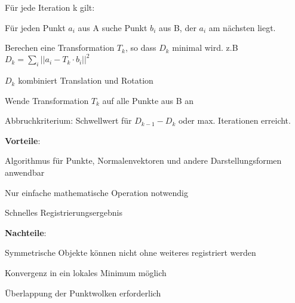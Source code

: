 \begin{compactenum}
    \item Für jede Iteration k gilt:
    \begin{compactitem}
        \item Für jeden Punkt $a_i$ aus A suche Punkt $b_i$ aus B, der $a_i$ am nächsten
        liegt.
        \item Berechen eine Transformation $T_k$, so dass $D_k$ minimal wird. z.B
        $D_k = \sum_i || a_i - T_k \cdot b_i || ^2$
    \end{compactitem}
    \item $D_k$ kombiniert Translation und Rotation
    \item Wende Transformation $T_k$ auf alle Punkte aus B an
    \item Abbruchkriterium: Schwellwert für $D_{k-1}-D_k$ oder max. Iterationen erreicht.
\end{compactenum}
\begin{compactitem}
    \item \textbf{Vorteile}:
    \begin{compactitem}
        \item Algorithmus für Punkte, Normalenvektoren und andere Darstellungsformen
        anwendbar
        \item Nur einfache mathematische Operation notwendig
        \item Schnelles Registrierungsergebnis
    \end{compactitem}
    \item \textbf{Nachteile}:
    \begin{compactitem}

    \item Symmetrische Objekte können nicht ohne weiteres registriert werden
    \item Konvergenz in ein lokales Minimum möglich
    \item Überlappung der Punktwolken erforderlich
\end{compactitem}

\end{compactitem}
